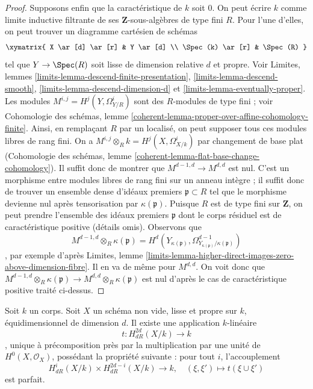 \begin{proof}
\medskip\noindent
Supposons enfin que la caractéristique de $k$ soit $0$.
On peut écrire $k$ comme limite inductive filtrante de ses
$\mathbf{Z}$-sous-algèbres de type fini $R$. Pour l'une d'elles, on peut trouver un
diagramme cartésien de schémas
$$
\xymatrix{
X \ar[d] \ar[r] & Y \ar[d] \\
\Spec(k) \ar[r] & \Spec(R)
}
$$
tel que $Y \to \Spec(R)$ soit lisse de dimension relative $d$ et propre.
Voir Limites, lemmes \ref{limits-lemma-descend-finite-presentation},
\ref{limits-lemma-descend-smooth}, \ref{limits-lemma-descend-dimension-d} et
\ref{limits-lemma-eventually-proper}.
Les modules $M^{i, j} = H^j(Y, \Omega^i_{Y/R})$ sont des $R$-modules de type fini ; voir
Cohomologie des schémas, lemme
\ref{coherent-lemma-proper-over-affine-cohomology-finite}.
Ainsi, en remplaçant $R$ par un localisé, on peut supposer tous ces
modules libres de rang fini. On a
$M^{i, j} \otimes_R k = H^j(X, \Omega^i_{X/k})$
par changement de base plat (Cohomologie des schémas, lemme
\ref{coherent-lemma-flat-base-change-cohomology}).
Il suffit donc de montrer que $M^{d - 1, d} \to M^{d, d}$
est nul. C'est un morphisme entre modules libres de rang fini sur un anneau intègre ;
il suffit donc de trouver un ensemble dense d'idéaux premiers $\mathfrak p \subset R$
tel que le morphisme devienne nul après tensorisation par $\kappa(\mathfrak p)$.
Puisque $R$ est de type fini sur $\mathbf{Z}$, on peut prendre
l'ensemble des idéaux premiers $\mathfrak p$ dont le corps résiduel
est de caractéristique positive (détails omis). Observons que
$$
M^{d - 1, d} \otimes_R \kappa(\mathfrak p) =
H^d(Y_{\kappa(\mathfrak p)},
\Omega^{d - 1}_{Y_{\kappa(\mathfrak p)}/\kappa(\mathfrak p)})
$$,
par exemple d'après Limites, lemme
\ref{limits-lemma-higher-direct-images-zero-above-dimension-fibre}.
Il en va de même pour $M^{d, d}$. On voit donc que
$M^{d - 1, d} \otimes_R \kappa(\mathfrak p) \to
M^{d, d} \otimes_R \kappa(\mathfrak p)$
est nul d'après le cas de caractéristique positive traité ci-dessus.
\end{proof}

\begin{proposition}
\label{proposition-poincare-duality}
Soit $k$ un corps. Soit $X$ un schéma non vide, lisse et propre sur $k$,
équidimensionnel de dimension $d$. Il existe une application $k$-linéaire
$$
t : H^{2d}_{dR}(X/k) \longrightarrow k
$$,
unique à précomposition près par la multiplication par une unité de
$H^0(X, \mathcal{O}_X)$, possédant la propriété suivante : pour tout $i$, l'accouplement
$$
H^i_{dR}(X/k) \times H_{dR}^{2d - i}(X/k)
\longrightarrow
k, \quad
(\xi, \xi') \longmapsto t(\xi \cup \xi')
$$
est parfait.
\end{proposition}

